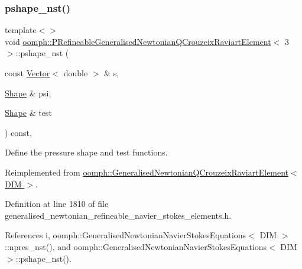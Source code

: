 \subsubsection{\texorpdfstring{pshape\+\_\+nst()}{pshape\_nst()}\hspace{0.1cm}{\footnotesize\ttfamily [6/6]}}
{\footnotesize\ttfamily template$<$$>$ \\
void \hyperlink{classoomph_1_1PRefineableGeneralisedNewtonianQCrouzeixRaviartElement}{oomph\+::\+P\+Refineable\+Generalised\+Newtonian\+Q\+Crouzeix\+Raviart\+Element}$<$ 3 $>$\+::pshape\+\_\+nst (\begin{DoxyParamCaption}\item[{const \hyperlink{classoomph_1_1Vector}{Vector}$<$ double $>$ \&}]{s,  }\item[{\hyperlink{classoomph_1_1Shape}{Shape} \&}]{psi,  }\item[{\hyperlink{classoomph_1_1Shape}{Shape} \&}]{test }\end{DoxyParamCaption}) const\hspace{0.3cm}{\ttfamily [inline]}, {\ttfamily [virtual]}}



Define the pressure shape and test functions. 



Reimplemented from \hyperlink{classoomph_1_1GeneralisedNewtonianQCrouzeixRaviartElement_aaf51b44d72cceba2115671c6d99cb38c}{oomph\+::\+Generalised\+Newtonian\+Q\+Crouzeix\+Raviart\+Element$<$ D\+I\+M $>$}.



Definition at line 1810 of file generalised\+\_\+newtonian\+\_\+refineable\+\_\+navier\+\_\+stokes\+\_\+elements.\+h.



References i, oomph\+::\+Generalised\+Newtonian\+Navier\+Stokes\+Equations$<$ D\+I\+M $>$\+::npres\+\_\+nst(), and oomph\+::\+Generalised\+Newtonian\+Navier\+Stokes\+Equations$<$ D\+I\+M $>$\+::pshape\+\_\+nst().

\mbox{\label{classoomph_1_1PRefineableGeneralisedNewtonianQCrouzeixRaviartElement_a3798bef44fa4927be5c844432fc212d9}} 
